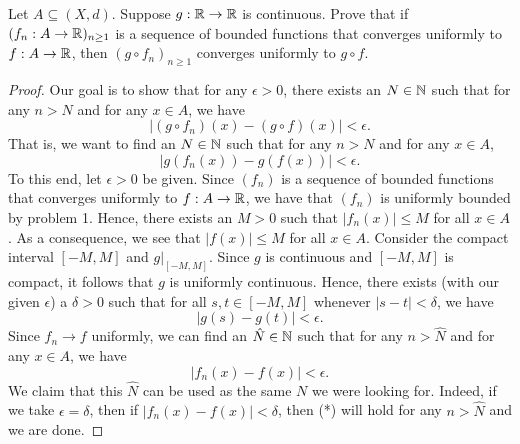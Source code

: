 \documentclass[a4paper]{article}
\begin{document}
\begin{problem}
    Let \( A \subseteq  (X,d) \). Suppose \( g : \mathbb{R} \to \mathbb{R}  \) is continuous. Prove that if \( ({f}_{n}: A \to \mathbb{R} )_{n \geq 1} \) is a sequence of bounded functions that converges uniformly to \( f: A \to \mathbb{R}  \), then \( (g \circ {f}_{n})_{n \geq 1} \) converges uniformly to \( g \circ f \).
\end{problem} 
\begin{proof}
Our goal is to show that for any \( \epsilon > 0  \), there exists an \( N \in \mathbb{N} \) such that for any \( n > N  \) and for any \( x \in A  \), we have 
\[  | (g \circ {f}_{n})(x) - (g \circ f)(x) | < \epsilon. \]
That is, we want to find an \( N \in \mathbb{N} \) such that for any \( n > N  \) and for any \( x \in A  \),
\[  | g({f}_{n}(x)) - g(f(x)) | < \epsilon. \tag{*}   \]
To this end, let \( \epsilon > 0 \) be given. Since \( ({f}_{n}) \) is a sequence of bounded functions that converges uniformly to \( f: A \to \mathbb{R}  \), we have that \( ({f}_{n}) \) is uniformly bounded by problem 1. Hence, there exists an \( M > 0  \) such that \( | {f}_{n}(x) |  \leq M  \) for all \( x \in A  \). As a consequence, we see that \( | f(x) | \leq M  \) for all \( x \in A  \). Consider the compact interval \( [-M,M] \) and \( g |_{[-M,M]} \). Since \( g  \) is continuous and \( [-M,M] \) is compact, it follows that \( g  \) is uniformly continuous. Hence, there exists (with our given \( \epsilon \)) a \( \delta > 0  \) such that for all \( s,t \in [-M,M] \) whenever \( | s - t  |  < \delta \), we have  
\[  | g(s) - g(t)  | < \epsilon. \]
Since \( {f}_{n} \to f  \) uniformly, we can find an \( \hat{N} \in \mathbb{N} \) such that for any \( n > \hat{N} \) and for any \( x \in A  \), we have 
\[  | {f}_{n}(x) - f(x)  | < \epsilon.  \]
We claim that this \( \hat{N} \) can be used as the same \( N  \) we were looking for. Indeed, if we take \( \epsilon = \delta \), then if \( | {f}_{n}(x) - f(x) | < \delta \), then (*) will hold for any \( n > \hat{N} \) and we are done.
\end{proof}
\end{document}

